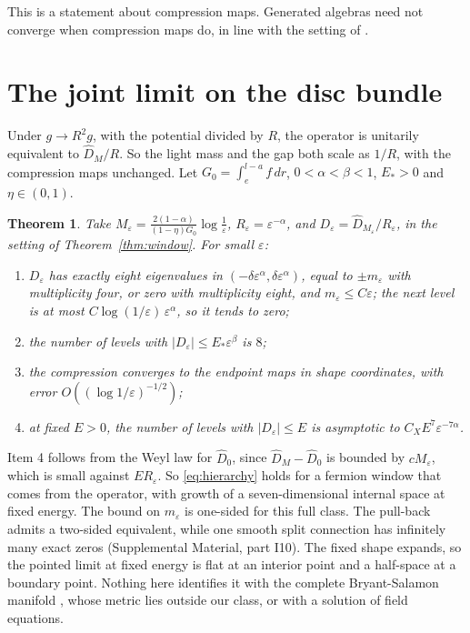 \documentclass[aps,prd,reprint,onecolumn,nofootinbib,amsmath,amssymb,floatfix]{revtex4-2}
\theoremstyle{plain}
\newtheorem{theorem}{Theorem}
\newcommand{\hatD}{\widehat D}
\newcommand{\supp}[1]{Supplemental Material, part #1}
\begin{document}
This is a statement about compression maps. Generated algebras need not converge when compression maps do, in line with the setting of \cite{CvS2021}.

\section{The joint limit on the disc bundle}\label{sec:joint}

Under $g\to R^2g$, with the potential divided by $R$, the operator is unitarily equivalent to $\hatD_M/R$. So the light mass and the gap both scale as $1/R$, with the compression maps unchanged. Let $G_0=\int_e^{l-a}f\,dr$, $0<\alpha<\beta<1$, $E_*>0$ and $\eta\in(0,1)$.

\begin{theorem}\label{thm:joint}
Take $M_\varepsilon=\frac{2(1-\alpha)}{(1-\eta)G_0}\log\frac1\varepsilon$, $R_\varepsilon=\varepsilon^{-\alpha}$, and $D_\varepsilon=\hatD_{M_\varepsilon}/R_\varepsilon$, in the setting of Theorem~\ref{thm:window}. For small $\varepsilon$:
\begin{enumerate}
\item $D_\varepsilon$ has exactly eight eigenvalues in $(-\delta\varepsilon^\alpha,\delta\varepsilon^\alpha)$, equal to $\pm m_\varepsilon$ with multiplicity four, or zero with multiplicity eight, and $m_\varepsilon\le C\varepsilon$; the next level is at most $C\log(1/\varepsilon)\,\varepsilon^\alpha$, so it tends to zero;
\item the number of levels with $|D_\varepsilon|\le E_*\varepsilon^\beta$ is $8$;
\item the compression converges to the endpoint maps in shape coordinates, with error $O((\log1/\varepsilon)^{-1/2})$;
\item at fixed $E>0$, the number of levels with $|D_\varepsilon|\le E$ is asymptotic to $C_XE^7\varepsilon^{-7\alpha}$.
\end{enumerate}
\end{theorem}

Item 4 follows from the Weyl law for $\hatD_0$, since $\hatD_M-\hatD_0$ is bounded by $cM_\varepsilon$, which is small against $ER_\varepsilon$. So \eqref{eq:hierarchy} holds for a fermion window that comes from the operator, with growth of a seven-dimensional internal space at fixed energy. The bound on $m_\varepsilon$ is one-sided for this full class. The pull-back admits a two-sided equivalent, while one smooth split connection has infinitely many exact zeros (\supp{I10}). The fixed shape expands, so the pointed limit at fixed energy is flat at an interior point and a half-space at a boundary point. Nothing here identifies it with the complete Bryant-Salamon manifold \cite{BS1989,KL2020}, whose metric lies outside our class, or with a solution of field equations.
\end{document}
